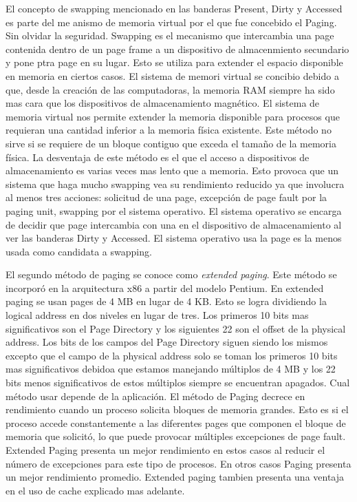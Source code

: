 El concepto de swapping mencionado en las banderas Present, Dirty y Accessed es
parte del me anismo de memoria virtual por el que fue concebido el Paging. Sin
olvidar la seguridad. Swapping es el mecanismo que intercambia una page
contenida dentro de un page frame a un dispositivo de almacenmiento secundario
y pone ptra page en su lugar. Esto se utiliza para extender el espacio
disponible en memoria en ciertos casos. El sistema de memori virtual se
concibio debido a que, desde la creación de las computadoras, la memoria RAM
siempre ha sido mas cara que los dispositivos de almacenamiento magnético. El
sistema de memoria virtual nos permite extender la memoria disponible para
procesos que requieran una cantidad inferior a la memoria física
existente. Este método no sirve si se requiere de un bloque contiguo que exceda
el tamaño de la memoria física. La desventaja de este método es el que el
acceso a dispositivos de almacenamiento es varias veces mas lento que a
memoria. Esto provoca que un sistema que haga mucho swapping vea su rendimiento
reducido ya que involucra al menos tres acciones: solicitud de una page,
excepción de page fault por la paging unit, swapping por el sistema
operativo. El sistema operativo se encarga de decidir que page intercambia con
una en el dispositivo de almacenamiento al ver las banderas Dirty y
Accessed. El sistema operativo usa la page es la menos usada como candidata a
swapping.

El segundo método de paging se conoce como \emph{extended paging}. Este método
se incorporó en la arquitectura x86 a partir del modelo Pentium. En extended
paging se usan pages de 4 MB en lugar de 4 KB. Esto se logra dividiendo la
logical address en dos niveles en lugar de tres. Los primeros 10 bits mas
significativos son el Page Directory y los siguientes 22 son el offset de la
physical address. Los bits de los campos del Page Directory siguen siendo los
mismos excepto que el campo de la physical address solo se toman los primeros
10 bits mas significativos debidoa que estamos manejando múltiplos de 4 MB y
los 22 bits menos significativos de estos múltiplos siempre se encuentran
apagados. Cual método usar depende de la aplicación. El método de Paging
decrece en rendimiento cuando un proceso solicita bloques de memoria
grandes. Esto es si el proceso accede constantemente a las diferentes pages que
componen el bloque de memoria que solicitó, lo que puede provocar múltiples
excepciones de page fault. Extended Paging presenta un mejor rendimiento en
estos casos al reducir el número de excepciones para este tipo de procesos. En
otros casos Paging presenta un mejor rendimiento promedio. Extended paging
tambien presenta una ventaja en el uso de cache explicado mas adelante.

